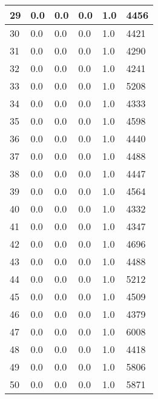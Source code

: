 \begin{longtable}{|l|l|l|l|l|l|}
29 & 0.0 & 0.0 & 0.0 & 1.0 & 4456 \\ \hline 
30 & 0.0 & 0.0 & 0.0 & 1.0 & 4421 \\ \hline 
31 & 0.0 & 0.0 & 0.0 & 1.0 & 4290 \\ \hline 
32 & 0.0 & 0.0 & 0.0 & 1.0 & 4241 \\ \hline 
33 & 0.0 & 0.0 & 0.0 & 1.0 & 5208 \\ \hline 
34 & 0.0 & 0.0 & 0.0 & 1.0 & 4333 \\ \hline 
35 & 0.0 & 0.0 & 0.0 & 1.0 & 4598 \\ \hline 
36 & 0.0 & 0.0 & 0.0 & 1.0 & 4440 \\ \hline 
37 & 0.0 & 0.0 & 0.0 & 1.0 & 4488 \\ \hline 
38 & 0.0 & 0.0 & 0.0 & 1.0 & 4447 \\ \hline 
39 & 0.0 & 0.0 & 0.0 & 1.0 & 4564 \\ \hline 
40 & 0.0 & 0.0 & 0.0 & 1.0 & 4332 \\ \hline 
41 & 0.0 & 0.0 & 0.0 & 1.0 & 4347 \\ \hline 
42 & 0.0 & 0.0 & 0.0 & 1.0 & 4696 \\ \hline 
43 & 0.0 & 0.0 & 0.0 & 1.0 & 4488 \\ \hline 
44 & 0.0 & 0.0 & 0.0 & 1.0 & 5212 \\ \hline 
45 & 0.0 & 0.0 & 0.0 & 1.0 & 4509 \\ \hline 
46 & 0.0 & 0.0 & 0.0 & 1.0 & 4379 \\ \hline 
47 & 0.0 & 0.0 & 0.0 & 1.0 & 6008 \\ \hline 
48 & 0.0 & 0.0 & 0.0 & 1.0 & 4418 \\ \hline 
49 & 0.0 & 0.0 & 0.0 & 1.0 & 5806 \\ \hline 
50 & 0.0 & 0.0 & 0.0 & 1.0 & 5871 \\ \hline 
\end{longtable}